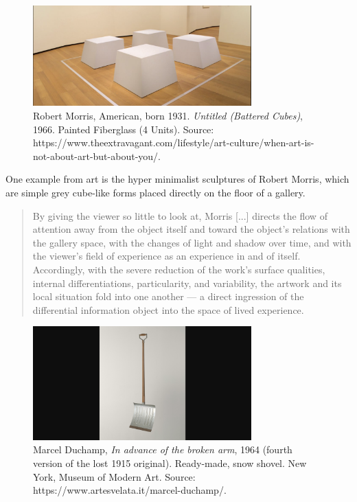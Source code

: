 \documentclass[letterpaper]{article}
\begin{document}
    \begin{figure}[h]
    \includegraphics[width=3.31in]{robert-morris-cubes.png}
    \caption{Robert Morris, American, born 1931. \emph{Untitled (Battered Cubes)}, 1966. Painted Fiberglass (4 Units). Source: https://www.theextravagant.com/lifestyle/art-culture/when-art-is-not-about-art-but-about-you/.}
    \end{figure}

    One example from art is the hyper minimalist sculptures of Robert Morris, which are simple grey cube-like forms placed directly on the floor of a gallery.

    \begin{quote}
        By giving the viewer so little to look at, Morris [...] directs the flow of attention away from the object itself and toward the object's relations with the gallery space, with the changes of light and shadow over time, and with the viewer's field of experience as an experience in and of itself. Accordingly, with the severe reduction of the work's surface qualities, internal differentiations, particularity, and variability, the artwork and its local situation fold into one another — a direct ingression of the differential information object into the space of lived experience. \citep[p.78]{HoelscherArtAsInfrmtn2021}
    \end{quote}

    \begin{figure}[h]
    \includegraphics[width=3.31in]{snow-shovel.png}
    \caption{Marcel Duchamp, \emph{In advance of the broken arm}, 1964 (fourth version of the lost 1915 original). Ready-made, snow shovel. New York, Museum of Modern Art. Source: https://www.artesvelata.it/marcel-duchamp/.}
    \end{figure}
\end{document}
